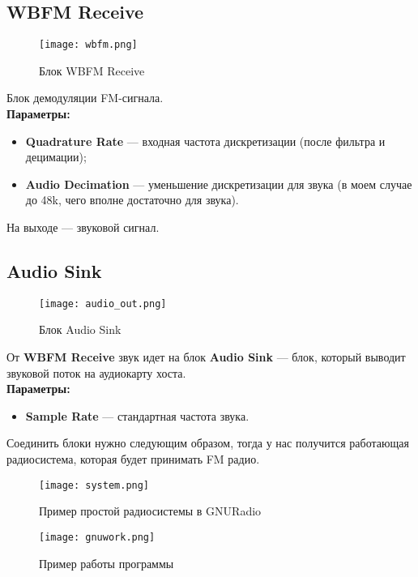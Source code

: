 \subsection*{\textbf{WBFM Receive}}

\begin{figure}[H]
    \centering
    \texttt{[image: wbfm.png]}
    \caption{Блок WBFM Receive}
\end{figure}

Блок демодуляции FM-сигнала. \\

\textbf{Параметры:}

\begin{itemize}
    \item \textbf{Quadrature Rate} — входная частота дискретизации (после фильтра и децимации);
    \item \textbf{Audio Decimation} — уменьшение дискретизации для звука (в моем случае до 48k, чего вполне достаточно для звука).
\end{itemize}

На выходе — звуковой сигнал.

\subsection*{\textbf{Audio Sink}}

\begin{figure}[H]
    \centering
    \texttt{[image: audio\_out.png]}
    \caption{Блок Audio Sink}
\end{figure}

От \textbf{WBFM Receive} звук идет на блок \textbf{Audio Sink} — блок, который выводит звуковой поток на аудиокарту хоста. \\

\textbf{Параметры:}

\begin{itemize}
    \item \textbf{Sample Rate} — стандартная частота звука.
\end{itemize}

Соединить блоки нужно следующим образом, тогда у нас получится работающая радиосистема, которая будет принимать FM радио.

\begin{figure}[H]
    \centering
    \texttt{[image: system.png]}
    \caption{Пример простой радиосистемы в GNURadio}
\end{figure}

\begin{figure}[H]
    \centering
    \texttt{[image: gnuwork.png]}
    \caption{Пример работы программы}
\end{figure}
